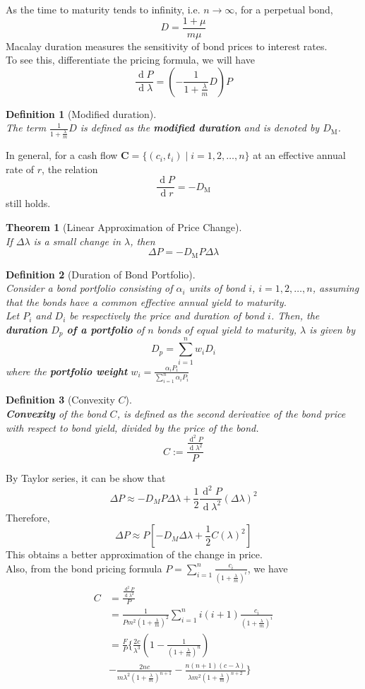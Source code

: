 \documentclass[11pt]{article}
\newtheorem{definition}{Definition}[section]
\newtheorem{theorem}{Theorem}[section]
\theoremstyle{definition}
\DeclareMathOperator{\diff}{d}
\newcommand\cf[1]{\mathbf{#1}}
\begin{document}
As the time to maturity tends to infinity, i.e. $n\to\infty$, for a perpetual bond,
\[
D=\frac{1+\mu}{m\mu}
\]
Macalay duration measures the sensitivity of bond prices to interest rates.\\
To see this, differentiate the pricing formula, we will have
\[
\frac{\diff P}{\diff \lambda}=\left(-\frac{1}{1+\frac{\lambda}{m}}D\right)P
\]
\begin{definition}[Modified duration]
\hfill\\\normalfont The term $\frac{1}{1+\frac{\lambda}{m}}D$ is defined as the \textbf{modified duration} and is denoted by $D_\text{M}$.
\end{definition}
In general, for a cash flow $\cf{C}=\{(c_i, t_i)\mid i = 1, 2,\ldots, n\}$ at an effective annual rate of $r$, the relation 
\[
\frac{\diff P}{\diff r} = -D_\text{M}
\]
still holds.
\begin{theorem}[Linear Approximation of Price Change]
\hfill\\\normalfont If $\Delta\lambda$ is a small change in $\lambda$, then
\[
\Delta P = -D_\text{M}P\Delta\lambda
\]
\end{theorem}
\begin{definition}[Duration of Bond Portfolio]
\hfill\\\normalfont Consider a bond portfolio consisting of $\alpha_i$ units of bond $i$, $i = 1, 2, \ldots, n$, assuming that the bonds have a \textit{common} effective annual yield to maturity.\\
Let $P_i$ and $D_i$ be respectively the price and duration of bond $i$. Then, the \textbf{duration} $D_p$ \textbf{of a portfolio} of $n$ bonds of equal yield to maturity, $\lambda$ is given by
\[
D_p = \sum_{i=1}^nw_iD_i
\]
where the \textbf{portfolio weight} $w_i = \frac{\alpha_i P_i}{\sum_{i=1}^n\alpha_i P_i}$
\end{definition}
\begin{definition}[Convexity $C$]
\hfill\\\normalfont \textbf{Convexity} of the bond $C$, is defined as the second derivative of the bond price with respect to bond yield, divided by the price of the bond.
\[
C:=\frac{\frac{\diff^2 P}{\diff \lambda^2}}{P}
\]
\end{definition}
By Taylor series, it can be show that
\[
\Delta P \approx -D_MP\Delta\lambda+\frac{1}{2}\frac{\diff^2 P}{\diff \lambda^2}(\Delta \lambda)^2
\]
Therefore,
\[
\Delta P \approx P\left[-D_M\Delta\lambda + \frac{1}{2}C(\lambda)^2\right]
\]
This obtains a better approximation of the change in price.\\
Also, from the bond pricing formula $P=\sum_{i=1}^n\frac{c_i}{\left(1+\frac{\lambda}{m}\right)^i}$, we have
\begin{align*}
C&=\frac{\frac{\diff^2 P}{\diff \lambda^2}}{P} \\
&=\frac{1}{Pm^2\left(1+\frac{\lambda}{m}\right)^2}\sum_{i=1}^n i(i+1)\frac{c_i}{\left(1+\frac{\lambda}{m}\right)^i}\\
&=\frac{F}{P}\{\frac{2c}{\lambda^3}\left(1-\frac{1}{\left(1+\frac{\lambda}{m}\right)^n}\right)\\&-\frac{2nc}{m\lambda^2\left(1+\frac{\lambda}{m}\right)^{n+1}}-\frac{n(n+1)(c-\lambda)}{\lambda m^2\left(1+\frac{\lambda}{m}\right)^{n+2}}\}
\end{align*}
\end{document}
